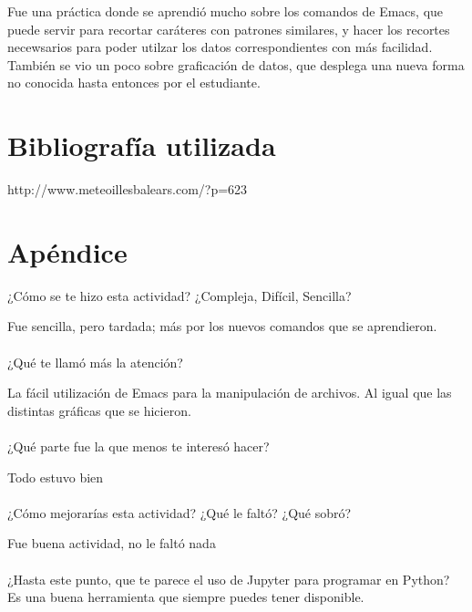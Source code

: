 \documentclass{article}
\begin{document}
Fue una práctica donde se aprendió mucho sobre los comandos de Emacs, que puede servir para recortar caráteres con patrones similares, y hacer los recortes necewsarios para poder utilzar los datos correspondientes con más facilidad. También se vio un poco sobre graficación de datos, que desplega una nueva forma no conocida hasta entonces por el estudiante.

\section{Bibliografía utilizada}

http://www.meteoillesbalears.com/?p=623

\section{Apéndice}

¿Cómo se te hizo esta actividad? ¿Compleja, Difícil, Sencilla?

Fue sencilla, pero tardada; más por los nuevos comandos que se aprendieron.
\\
\\
¿Qué te llamó más la atención?

La fácil utilización de Emacs para la manipulación de archivos. Al igual que las distintas gráficas que se hicieron.
\\
\\
¿Qué parte fue la que menos te interesó hacer?

Todo estuvo bien
\\
\\
¿Cómo mejorarías esta actividad? ¿Qué le faltó? ¿Qué sobró?

Fue buena actividad, no le faltó nada
\\
\\
¿Hasta este punto, que te parece el uso de Jupyter para programar en Python? 
Es una buena herramienta que siempre puedes tener disponible.
\end{document}
